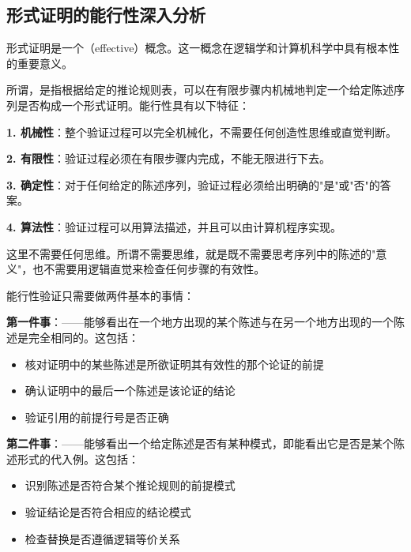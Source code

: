\subsection{形式证明的能行性深入分析}

形式证明是一个（effective）概念。这一概念在逻辑学和计算机科学中具有根本性的重要意义。

\begin{theorembox}[title=能行性的精确定义]
所谓，是指根据给定的推论规则表，可以在有限步骤内机械地判定一个给定陈述序列是否构成一个形式证明。能行性具有以下特征：

\textbf{1. 机械性}：整个验证过程可以完全机械化，不需要任何创造性思维或直觉判断。

\textbf{2. 有限性}：验证过程必须在有限步骤内完成，不能无限进行下去。

\textbf{3. 确定性}：对于任何给定的陈述序列，验证过程必须给出明确的"是"或"否"的答案。

\textbf{4. 算法性}：验证过程可以用算法描述，并且可以由计算机程序实现。
\end{theorembox}

这里不需要任何思维。所谓不需要思维，就是既不需要思考序列中的陈述的"意义"，也不需要用逻辑直觉来检查任何步骤的有效性。

\begin{examplebox}[title=能行性验证的两个基本要求]
能行性验证只需要做两件基本的事情：

\textbf{第一件事}：——能够看出在一个地方出现的某个陈述与在另一个地方出现的一个陈述是完全相同的。这包括：
\begin{itemize}
\item 核对证明中的某些陈述是所欲证明其有效性的那个论证的前提
\item 确认证明中的最后一个陈述是该论证的结论
\item 验证引用的前提行号是否正确
\end{itemize}

\textbf{第二件事}：——能够看出一个给定陈述是否有某种模式，即能看出它是否是某个陈述形式的代入例。这包括：
\begin{itemize}
\item 识别陈述是否符合某个推论规则的前提模式
\item 验证结论是否符合相应的结论模式
\item 检查替换是否遵循逻辑等价关系
\end{itemize}
\end{examplebox}

